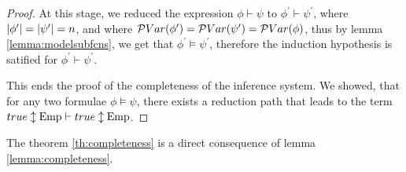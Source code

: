 \begin{proof}
At this stage, we reduced the expression $\phi \vdash \psi$ to $\phi^{\prime} \vdash \psi^{\prime}$, where $|{\phi^{\prime}}|=|{\psi^{\prime}}|=n$, and where
$\mathcal{P}Var(\phi^{\prime})=\mathcal{P}Var(\psi^{\prime})=\mathcal{P}Var(\phi)$, thus
by lemma \ref{lemma:modelsubfcns}, we get that $\phi^{\prime}\models\psi^{\prime}$, therefore the induction hypothesis is satified for $\phi^{\prime}\vdash \psi^{\prime}$.

This ends the proof of the completeness of the inference system. We showed, that
for any two formulae $\phi \models \psi$, there exists a reduction path that
leads to the term $\Formula{\true}{\Emp} \vdash \Formula{\true}{\Emp}$.
\end{proof}

The theorem \ref{th:completeness} is a direct consequence of lemma \ref{lemma:completeness}.
